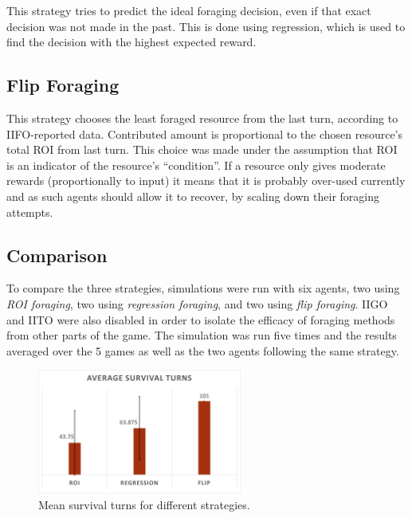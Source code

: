 This strategy tries to predict the ideal foraging decision, even if that exact decision was not made in the past. This is done using regression, which is used to find the decision with the highest expected reward.


\subsection{Flip Foraging}

This strategy chooses the least foraged resource from the last turn, according to IIFO-reported data. Contributed amount is proportional to the chosen resource's total ROI from last turn. This choice was made under the assumption that ROI is an indicator of the resource's ``condition''. If a resource only gives moderate rewards (proportionally to input) it means that it is probably over-used currently and as such agents should allow it to recover, by scaling down their foraging attempts.

\subsection{Comparison}

To compare the three strategies, simulations were run with six agents, two using \emph{ROI foraging}, two using \emph{regression foraging}, and two using \emph{flip foraging}. IIGO and IITO were also disabled in order to isolate the efficacy of foraging methods from other parts of the game. The simulation was run five times and the results averaged over the 5 games as well as the two agents following the same strategy.

\begin{figure}[H] 
\centering
\includegraphics[width=0.6\textwidth]{09_team1_agentdesign/images/mean_survival_turns}
\caption{Mean survival turns for different strategies.}
\label{fig:team1:mean_survival}
\end{figure} 

